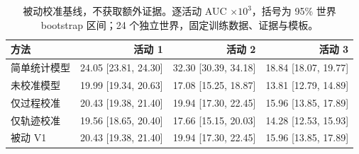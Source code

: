\begin{table}[H]
\centering
\caption{被动校准基线，不获取额外证据。逐活动 AUC $\times10^3$，括号为 95\% 世界 bootstrap 区间；24 个独立世界，固定训练数据、证据与模板。}
\label{tab:calibration}
\scriptsize
\setlength{\tabcolsep}{3pt}
\begin{tabular}{lrrr}
\toprule
方法 & 活动 1 & 活动 2 & 活动 3 \\
\midrule
简单统计模型 & 24.05 [23.81, 24.30] & 32.30 [30.39, 34.18] & 18.84 [18.07, 19.77] \\
未校准模型 & 19.99 [19.34, 20.63] & 17.08 [15.25, 18.87] & 13.81 [12.79, 14.89] \\
仅过程校准 & 20.43 [19.38, 21.40] & 19.94 [17.30, 22.45] & 15.96 [13.85, 17.89] \\
仅轨迹校准 & 19.56 [18.65, 20.40] & 17.66 [15.15, 20.03] & 14.28 [12.53, 15.93] \\
被动 V1 & 20.43 [19.38, 21.40] & 19.94 [17.30, 22.45] & 15.96 [13.85, 17.89] \\
\bottomrule
\end{tabular}
\end{table}
